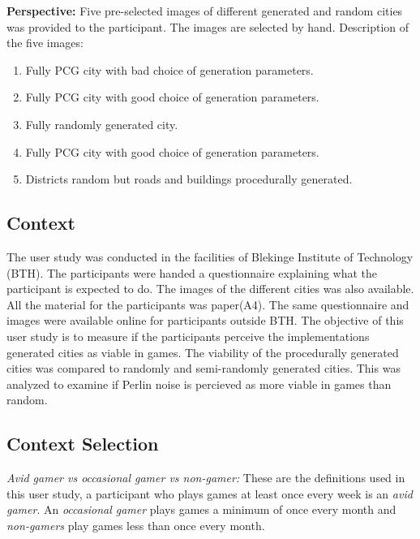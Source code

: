 	\par
	\textbf{Perspective:}
	Five pre-selected images of different generated and random cities was provided to the participant. The images are selected by hand. Description of the five images:
	
	\begin{enumerate}
		\setlength\itemsep{0.01cm}
		\item Fully PCG city with bad choice of generation parameters.
		\item Fully PCG city with good choice of generation parameters.
		\item Fully randomly generated city.
		\item Fully PCG city with good choice of generation parameters.
		\item Districts random but roads and buildings procedurally generated.
	\end{enumerate}
			
	\subsection{Context}
	The user study was conducted in the facilities of Blekinge Institute of Technology (BTH). The participants were handed a questionnaire explaining what the participant is expected to do. The images of the different cities was also available. All the material for the participants was paper(A4). The same questionnaire and images were available online for participants outside BTH. The objective of this user study is to measure if the participants perceive the implementations generated cities as viable in games. The viability of the procedurally generated cities was compared to randomly and semi-randomly generated cities. This was analyzed to examine if Perlin noise is percieved as more viable in games than random.
	
		
	\subsection{Context Selection}
	\textit{Avid gamer vs occasional gamer vs non-gamer:} These are the definitions used in this user study, a participant who plays games at least once every week is an \textit{avid gamer}. An \textit{occasional gamer} plays games a minimum of once every month and \textit{non-gamers} play games less than once every month. 
			
